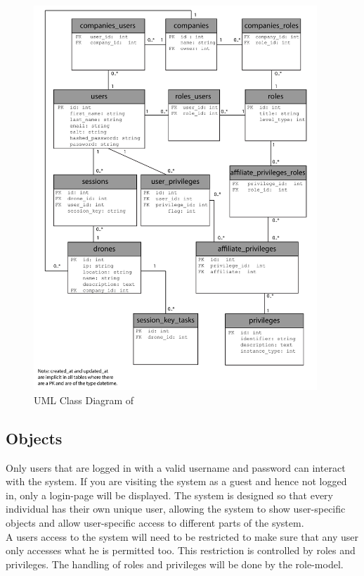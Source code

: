 \begin{figure}[htb]
    \centering
    \includegraphics[width=0.95\textwidth]{gfx/UML_model.pdf}
    \caption{UML Class Diagram of \projectname{}}
    \label{fig:UML_class_diagram}
\end{figure}


\subsection{Objects}
Only users that are logged in with a valid username and password can interact with the system.
If you are visiting the system as a guest and hence not logged in, only a login-page will be displayed.
The system is designed so that every individual has their own unique user, allowing the system to show user-specific objects and allow user-specific access to different parts of the system.\\

A users access to the system will need to be restricted to make sure that any user only accesses what he is permitted too.
This restriction is controlled by roles and privileges.
The handling of roles and privileges will be done by the role-model.\\

